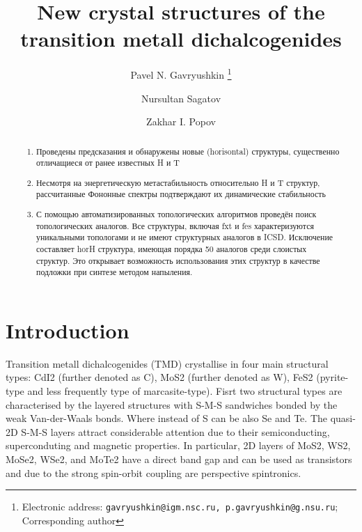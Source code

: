 \documentclass[a4paperm]{article}
\begin{document}

\title{New crystal structures of the transition metall dichalcogenides}


\author[1,2]{Pavel N. Gavryushkin
   \thanks{Electronic address: \texttt{gavryushkin@igm.nsc.ru, p.gavryushkin@g.nsu.ru}; Corresponding author}}     
\author[1]{Nursultan Sagatov}
\author[3]{Zakhar I. Popov}


\date{}
\maketitle


\begin{abstract}
\begin{enumerate}
	\item Проведены предсказания и обнаружены новые (horisontal) структуры, существенно отличащиеся от ранее известных H и T 
	\item Несмотря на энергетическую метастабильность относительно H и T структур, рассчитанные Фононные спектры подтверждают их динамические стабильность
	 \item С помощью автоматизированных топологических алгоритмов проведён поиск топологических аналогов. Все структуры, включая fxt и fes характеризуются уникальными топологами и не имеют структурных аналогов в ICSD. Исключение составляет horH структура, имеющая порядка 50 аналогов среди слоистых структур. Это открывает возможность использования этих структур в качестве подложки при синтезе методом напыления.
\end{enumerate}
\end{abstract}

\section*{Introduction}
Transition metall dichalcogenides (TMD) crystallise in four main structural types: CdI2 (further denoted as C), MoS2 (further denoted as W), FeS2 (pyrite-type and less frequently type of marcasite-type).
Fisrt two structural types are characterised by the layered structures with S-M-S sandwiches bonded by the weak Van-der-Waals bonds. 
Where instead of S can be also Se and Te.
The quasi-2D S-M-S layers attract considerable attention due to their semiconducting, superconduting and magnetic properties.
In particular, 2D layers of MoS2, WS2, MoSe2, WSe2, and MoTe2 have a direct band gap and can be used as transistors and due to the strong spin-orbit coupling are perspective spintronics.
\end{document}
